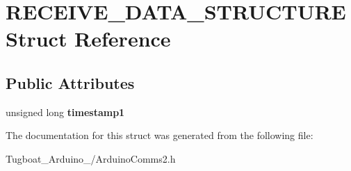 \hypertarget{struct_r_e_c_e_i_v_e___d_a_t_a___s_t_r_u_c_t_u_r_e}{}\section{R\+E\+C\+E\+I\+V\+E\+\_\+\+D\+A\+T\+A\+\_\+\+S\+T\+R\+U\+C\+T\+U\+RE Struct Reference}
\label{struct_r_e_c_e_i_v_e___d_a_t_a___s_t_r_u_c_t_u_r_e}
\subsection*{Public Attributes}
\begin{DoxyCompactItemize}
\item 
unsigned long {\bfseries timestamp1}\hypertarget{struct_r_e_c_e_i_v_e___d_a_t_a___s_t_r_u_c_t_u_r_e_a321dd55121b07ecfc7902ba462f224cd}{}\label{struct_r_e_c_e_i_v_e___d_a_t_a___s_t_r_u_c_t_u_r_e_a321dd55121b07ecfc7902ba462f224cd}

\end{DoxyCompactItemize}


The documentation for this struct was generated from the following file\+:\begin{DoxyCompactItemize}
\item 
Tugboat\+\_\+\+Arduino\+\_/Arduino\+Comms2.\+h\end{DoxyCompactItemize}
